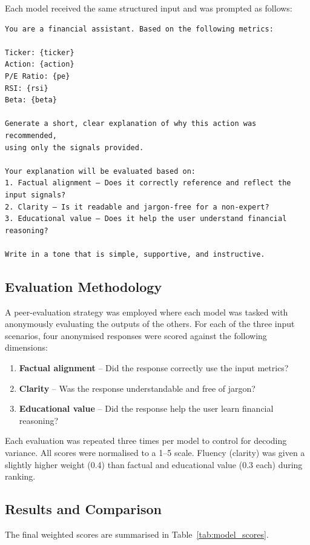 Each model received the same structured input and was prompted as follows:

\begin{verbatim}
You are a financial assistant. Based on the following metrics:

Ticker: {ticker}
Action: {action}
P/E Ratio: {pe}
RSI: {rsi}
Beta: {beta}

Generate a short, clear explanation of why this action was recommended,
using only the signals provided.

Your explanation will be evaluated based on:
1. Factual alignment – Does it correctly reference and reflect the input signals?
2. Clarity – Is it readable and jargon-free for a non-expert?
3. Educational value – Does it help the user understand financial reasoning?

Write in a tone that is simple, supportive, and instructive.
\end{verbatim}

\subsection{Evaluation Methodology}

A peer-evaluation strategy was employed where each model was tasked with anonymously evaluating the outputs of the others. For each of the three input scenarios, four anonymised responses were scored against the following dimensions:

\begin{enumerate}
    \item \textbf{Factual alignment} – Did the response correctly use the input metrics?
    \item \textbf{Clarity} – Was the response understandable and free of jargon?
    \item \textbf{Educational value} – Did the response help the user learn financial reasoning?
\end{enumerate}

Each evaluation was repeated three times per model to control for decoding variance. All scores were normalised to a 1–5 scale. Fluency (clarity) was given a slightly higher weight (0.4) than factual and educational value (0.3 each) during ranking.

\subsection{Results and Comparison}

The final weighted scores are summarised in Table~\ref{tab:model_scores}.

